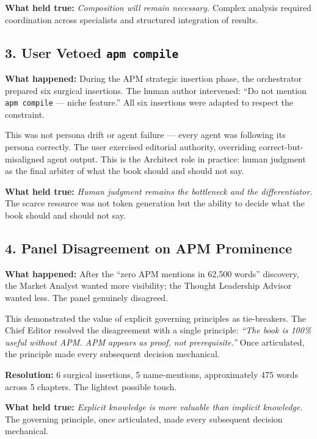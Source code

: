 \documentclass[
  a4paper,
  DIV=11,
  numbers=noendperiod]{scrreprt}
\begin{document}
\textbf{What held true:} \emph{Composition will remain necessary.}
Complex analysis required coordination across specialists and structured
integration of results.

\subsection{\texorpdfstring{3. User Vetoed
\texttt{apm\ compile}}{3. User Vetoed apm compile}}\label{user-vetoed-apm-compile}

\textbf{What happened:} During the APM strategic insertion phase, the
orchestrator prepared six surgical insertions. The human author
intervened: ``Do not mention \texttt{apm\ compile} --- niche feature.''
All six insertions were adapted to respect the constraint.

This was not persona drift or agent failure --- every agent was
following its persona correctly. The user exercised editorial authority,
overriding correct-but-misaligned agent output. This is the Architect
role in practice: human judgment as the final arbiter of what the book
should and should not say.

\textbf{What held true:} \emph{Human judgment remains the bottleneck and
the differentiator.} The scarce resource was not token generation but
the ability to decide what the book should and should not say.

\subsection{4. Panel Disagreement on APM
Prominence}\label{panel-disagreement-on-apm-prominence}

\textbf{What happened:} After the ``zero APM mentions in 62,500 words''
discovery, the Market Analyst wanted more visibility; the Thought
Leadership Advisor wanted less. The panel genuinely disagreed.

This demonstrated the value of explicit governing principles as
tie-breakers. The Chief Editor resolved the disagreement with a single
principle: \emph{``The book is 100\% useful without APM. APM appears as
proof, not prerequisite.''} Once articulated, the principle made every
subsequent decision mechanical.

\textbf{Resolution:} 6 surgical insertions, 5 name-mentions,
approximately 475 words across 5 chapters. The lightest possible touch.

\textbf{What held true:} \emph{Explicit knowledge is more valuable than
implicit knowledge.} The governing principle, once articulated, made
every subsequent decision mechanical.
\end{document}
